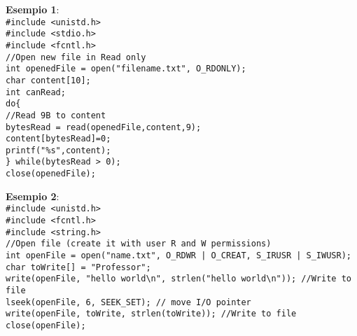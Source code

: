 \begin{flushleft}
\begin{itemize}
\begin{itemize}
          \end{itemize}          
          \begin{flushleft}
            \textbf{Esempio 1}: \\
            \texttt{\#include <unistd.h> \\
            \#include <stdio.h>\\
            \#include <fcntl.h>\\
            //Open new file in Read only\\
            int openedFile = open("filename.txt", O\_RDONLY);\\
            char content[10]; \\
            int canRead;\\
            do\{\\
            \tab //Read 9B to content\\
            \tab bytesRead = read(openedFile,content,9);\\
            \tab content[bytesRead]=0;\\
            \tab printf("\%s",content);\\
            \} while(bytesRead > 0);\\
            close(openedFile); }
          \end{flushleft}
          \begin{flushleft}
            \textbf{Esempio 2}:\\
            \texttt{\#include <unistd.h>\\
            \#include <fcntl.h>\\
            \#include <string.h>\\
            //Open file (create it with user R and W permissions)\\
            int openFile = open("name.txt", O\_RDWR | O\_CREAT, S\_IRUSR | S\_IWUSR);\\
            char toWrite[] = "Professor";\\
            write(openFile, "hello world\textbackslash n", strlen("hello world\textbackslash n")); //Write to file\\
            lseek(openFile, 6, SEEK\_SET); // move I/O pointer\\
            write(openFile, toWrite, strlen(toWrite)); //Write to file\\
            close(openFile); } 
          \end{flushleft}
  \end{itemize}

\end{flushleft}
